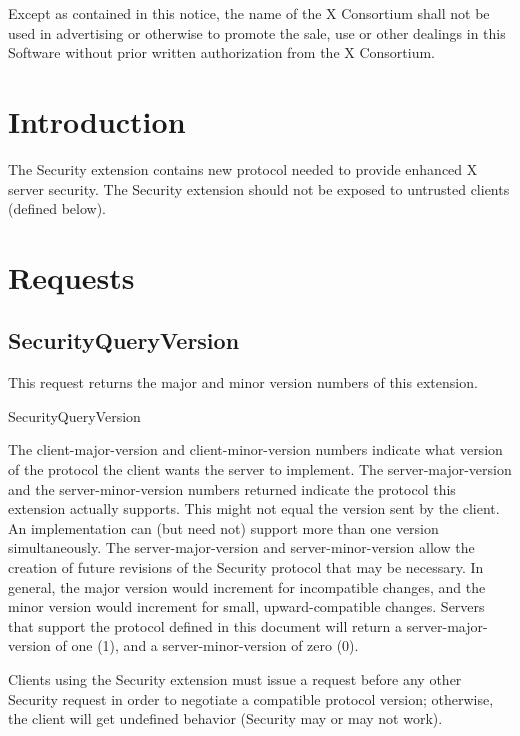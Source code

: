 Except as contained in this notice, the name of the X Consortium shall
not be used in advertising or otherwise to promote the sale, use or
other dealings in this Software without prior written authorization
from the X Consortium.
\eject

\section{Introduction}

The Security extension contains new protocol needed to provide
enhanced X server security.  The Security extension should not be
exposed to untrusted clients (defined below).

\section{Requests}

\subsection{SecurityQueryVersion}

This request returns the major and minor version numbers of this
extension.

\begin{arequest}{SecurityQueryVersion}
\areply
{}
\end{arequest}

The client-major-version and client-minor-version
numbers indicate what version of the protocol the client wants the
server to implement.  The server-major-version and the
server-minor-version numbers returned indicate the protocol
this extension actually supports.  This might not equal the version
sent by the client.  An implementation can (but need not) support more
than one version simultaneously.  The server-major-version
and server-minor-version allow the creation of future
revisions of the Security protocol that may be
necessary.  In general, the major version would increment for
incompatible changes, and the minor version would increment for small,
upward-compatible changes.  Servers that support the protocol defined
in this document will return a server-major-version of one
(1), and a server-minor-version of zero (0).

Clients using the Security extension must issue a
 request before any other Security
request in order to negotiate a compatible protocol version;
otherwise, the client will get undefined behavior (Security may or may
not work).

